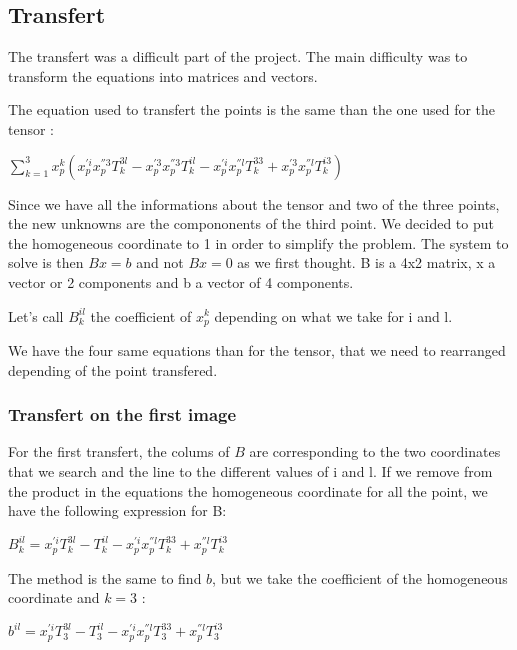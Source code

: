 \documentclass{report}
\begin{document}
\subsection{Transfert}
The transfert was a difficult part of the project. The main difficulty was to transform the equations into matrices and vectors.

The equation used to transfert the points is the same than the one used for the tensor : 
\begin{center}
 $ \displaystyle { \sum_{k = 1}^{3}} x_{p}^{k}(x_{p}^{'i}x_{p}^{''3}T_{k}^{3l} - x_{p}^{'3}x_{p}^{''3}T_{k}^{il} - x_{p}^{'i}x_{p}^{''l}T_{k}^{33} + x_{p}^{'3}x_{p}^{''l}T_{k}^{i3})$ 
\end{center}

Since we have all the informations about the tensor and two of the three points, the new unknowns are the compononents of the third point. We decided to put the homogeneous coordinate to 1 in order to simplify the problem. The system to solve is then $Bx=b$ and not $Bx=0$ as we first thought. B is a 4x2 matrix, x a vector or 2 components and b a vector of 4 components. 

Let's call $B_{k}^{il}$ the coefficient of $x_{p}^{k}$ depending on what we take for i and l. 

We have the four same equations than for the tensor, that we need to rearranged depending of the point transfered.


\subsubsection{Transfert on the first image}
For the first transfert, the colums of $B$ are corresponding to the two coordinates that we search and the line to the different values of i and l. If we remove from the product in the equations the homogeneous coordinate for all the point, we have the following expression for B:

\begin{center}
$B_{k}^{il} = x_{p}^{'i}T_{k}^{3l} - T_{k}^{il} - x_{p}^{'i}x_{p}^{''l}T_{k}^{33} + x_{p}^{''l}T_{k}^{i3}$
\end{center}

The method is the same to find $b$, but we take the coefficient of the homogeneous coordinate and $k=3$ : 

\begin{center}
$b^{il} = x_{p}^{'i}T_{3}^{3l} - T_{3}^{il} - x_{p}^{'i}x_{p}^{''l}T_{3}^{33} + x_{p}^{''l}T_{3}^{i3}$
\end{center}
\end{document}
